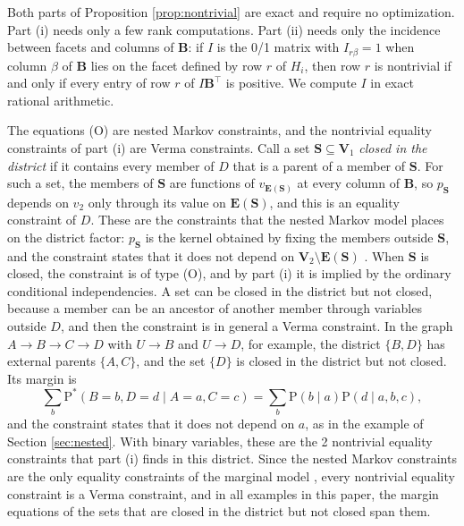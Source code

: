 \documentclass[12pt]{article}
\def\Pr{{\mathrm{P}}}
\def\Pdo{{\mathrm{P}^*}}
\newcommand{\bV}{\boldsymbol{V}}
\newcommand{\bS}{\boldsymbol{S}}
\begin{document}
Both parts of Proposition \ref{prop:nontrivial} are exact and require no optimization. Part (i) needs only a few rank computations. Part (ii) needs only the incidence between facets and columns of $\boldsymbol{B}$: if $I$ is the 0/1 matrix with $I_{r\beta} = 1$ when column $\beta$ of $\boldsymbol{B}$ lies on the facet defined by row $r$ of $H_i$, then row $r$ is nontrivial if and only if every entry of row $r$ of $I \boldsymbol{B}^\top$ is positive. We compute $I$ in exact rational arithmetic.


The equations (O) are nested Markov constraints, and the nontrivial equality constraints of part (i) are Verma constraints. Call a set $\bS \subseteq \bV_1$ \emph{closed in the district} if it contains every member of $D$ that is a parent of a member of $\bS$. For such a set, the members of $\bS$ are functions of $v_{\boldsymbol{E}(\bS)}$ at every column of $\boldsymbol{B}$, so $p_{\bS}$ depends on $v_2$ only through its value on $\boldsymbol{E}(\bS)$, and this is an equality constraint of $D$. These are the constraints that the nested Markov model places on the district factor: $p_{\bS}$ is the kernel obtained by fixing the members outside $\bS$, and the constraint states that it does not depend on $\bV_2 \setminus \boldsymbol{E}(\bS)$ \citep{richardson2023nested}. When $\bS$ is closed, the constraint is of type (O), and by part (i) it is implied by the ordinary conditional independencies. A set can be closed in the district but not closed, because a member can be an ancestor of another member through variables outside $D$, and then the constraint is in general a Verma constraint. In the graph $A \rightarrow B \rightarrow C \rightarrow D$ with $U \rightarrow B$ and $U \rightarrow D$, for example, the district $\{B, D\}$ has external parents $\{A, C\}$, and the set $\{D\}$ is closed in the district but not closed. Its margin is
\[
\sum_b \Pdo(B = b, D = d \mid A = a, C = c) = \sum_b \Pr(b \mid a)\Pr(d \mid a, b, c),
\]
and the constraint states that it does not depend on $a$, as in the example of Section \ref{sec:nested}. With binary variables, these are the 2 nontrivial equality constraints that part (i) finds in this district. Since the nested Markov constraints are the only equality constraints of the marginal model \citep{evans2018margins}, every nontrivial equality constraint is a Verma constraint, and in all examples in this paper, the margin equations of the sets that are closed in the district but not closed span them.
\end{document}
